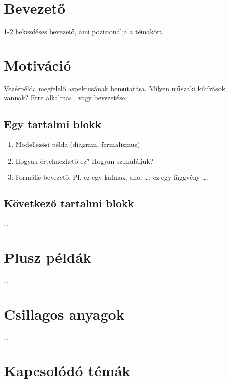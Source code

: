 
\section{Bevezető}

1-2 bekezdéses bevezető, ami pozicionálja a témakört.

\section{Motiváció}

Vezérpélda megfelelő aspektusának bemutatása. Milyen műszaki kihívások vannak? Erre alkalmas ,  vagy  bevezetése.

\subsection{Egy tartalmi blokk}

\begin{mdframed}
	\begin{enumerate}
	\item Modellezési példa (diagram, formalizmus)
	
	\item Hogyan értelmezhető ez? Hogyan szimuláljuk?
	
	\item Formális bevezető. Pl. ez egy halmaz, ahol \ldots; ez egy függvény \ldots.
	\end{enumerate}		
\end{mdframed}

\subsection{Következő tartalmi blokk}

\ldots

\section{Plusz példák}

\ldots

\section{Csillagos anyagok}

\ldots

\section{Kapcsolódó témák}

